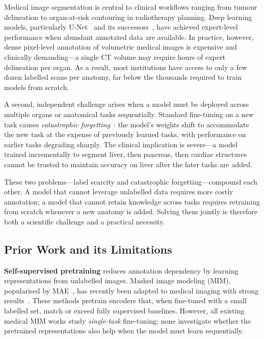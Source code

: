 \documentclass[conference]{IEEEtran}
\begin{document}
Medical image segmentation is central to clinical workflows ranging from tumour delineation to organ-at-risk contouring in radiotherapy planning. Deep learning models, particularly U-Net~\cite{ronneberger2015unet} and its successors~\cite{isensee2021nnunet}, have achieved expert-level performance when abundant annotated data are available. In practice, however, dense pixel-level annotation of volumetric medical images is expensive and clinically demanding—a single CT volume may require hours of expert delineation per organ. As a result, most institutions have access to only a few dozen labelled scans per anatomy, far below the thousands required to train models from scratch.

A second, independent challenge arises when a model must be deployed across multiple organs or anatomical tasks sequentially. Standard fine-tuning on a new task causes \emph{catastrophic forgetting}~\cite{kirkpatrick2017ewc}: the model's weights shift to accommodate the new task at the expense of previously learned tasks, with performance on earlier tasks degrading sharply. The clinical implication is severe—a model trained incrementally to segment liver, then pancreas, then cardiac structures cannot be trusted to maintain accuracy on liver after the later tasks are added.

These two problems—label scarcity and catastrophic forgetting—compound each other. A model that cannot leverage unlabelled data requires more costly annotation; a model that cannot retain knowledge across tasks requires retraining from scratch whenever a new anatomy is added. Solving them jointly is therefore both a scientific challenge and a practical necessity.

\subsection{Prior Work and its Limitations}

\textbf{Self-supervised pretraining} reduces annotation dependency by learning representations from unlabelled images. Masked image modeling (MIM), popularised by MAE~\cite{he2022mae}, has recently been adapted to medical imaging with strong results~\cite{xie2024rethinking,qi2024gmim,xing2024hybridmim,lyu2025masked,tang2026hiendmae}. These methods pretrain encoders that, when fine-tuned with a small labelled set, match or exceed fully supervised baselines. However, all existing medical MIM works study \emph{single-task} fine-tuning; none investigate whether the pretrained representations also help when the model must learn sequentially.
\end{document}
